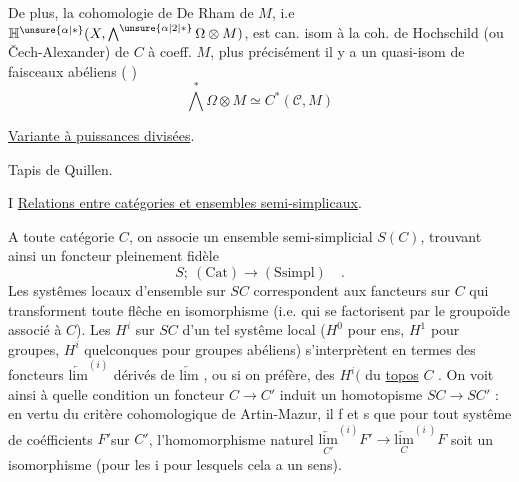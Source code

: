 
De plus, la cohomologie de De Rham de $M$, i.e $\mathbb H^{\unsure{\alpha|*}}(X,\bigwedge^{\unsure{\alpha|2|*}}\Omega\otimes M)$, est can. isom à la coh. de Hochschild (ou Čech-Alexander) de $C$ à coeff.  $M$, plus précisément il y a un quasi-isom  de  faisceaux abéliens ( )
\[
\bigwedge^*\Omega\otimes M\simeq C^*(\mathcal C,M)
\]

\uline{Variante à puissances divisées}.



Tapis de Quillen.

I \quad \uline{Relations entre catégories et ensembles semi-simplicaux}.

A toute catégorie $C$, on associe un ensemble semi-simplicial $S(C)$,
trouvant ainsi un foncteur pleinement fidèle 
\[ S;\ (\mathrm{Cat}) \longrightarrow (\mathrm{Ssimpl})\quad . \]
 Les systêmes locaux d'ensemble sur $SC$ correspondent
aux fancteurs sur $C$ qui transforment toute flêche en isomorphisme (i.e.
qui se factorisent par le groupoïde associé à $C$). Les $H^i$ sur $SC$ d'un tel
systême local ($H^0$ pour ens, $H^1$ pour groupes, $H^i$ quelconques pour groupes
abéliens) s'interprètent en termes des foncteurs $\underleftarrow{\mathrm{lim}}^{(i)}$ dérivés de $\underleftarrow{\mathrm{lim}}$ ,
ou si on préfère, des $H^i($ du \uline{topos} $C$ . On voit ainsi à quelle condition
un foncteur $C \to C'$ induit un homotopisme $SC \to SC'$ : en vertu du
critère cohomologique de Artin-Mazur, il f et s que pour tout systême
de coéfficients $F'$sur $C'$, l'homomorphisme naturel $\underset{C'}{\underleftarrow{\mathrm{lim}}}^{(i)}F' \longrightarrow \underset{C}{\underleftarrow{\mathrm{lim}}}^{(i\ )}F$
soit un isomorphisme (pour les i pour lesquels cela a un sens). 

